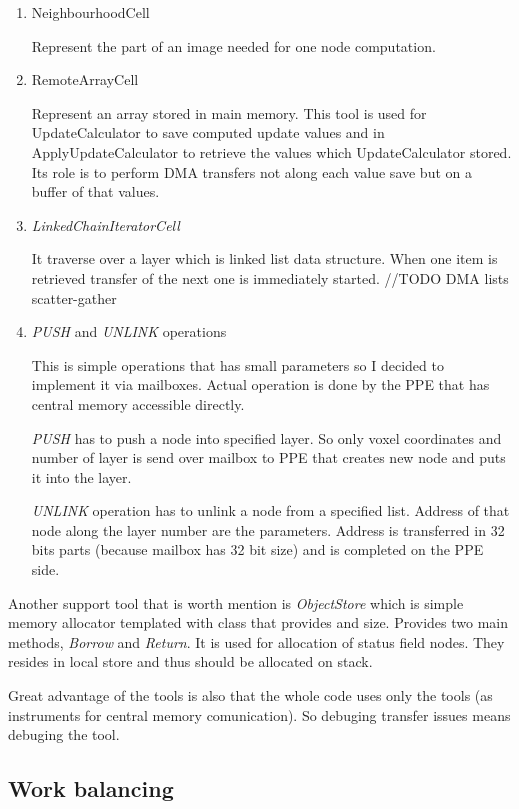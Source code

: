 \begin{enumerate}
\item NeighbourhoodCell
\par
Represent the part of an image needed for one node computation.

\item RemoteArrayCell
\par
Represent an array stored in main memory.
This tool is used for UpdateCalculator to save computed update values and in ApplyUpdateCalculator to retrieve the values which UpdateCalculator stored.
Its role is to perform DMA transfers not along each value save but on a buffer of that values.

\item \emph{LinkedChainIteratorCell}
\par
It traverse over a layer which is linked list data structure.
When one item is retrieved transfer of the next one is immediately started.
//TODO DMA lists scatter-gather

\item \emph{PUSH} and \emph{UNLINK} operations
\par
This is simple operations that has small parameters so I decided to implement it via mailboxes.
Actual operation is done by the PPE that has central memory accessible directly.
\par
\emph{PUSH} has to push a node into specified layer.
So only voxel coordinates and number of layer is send over mailbox to PPE that creates new node and puts it into the layer.

\par
\emph{UNLINK} operation has to unlink a node from a specified list.
Address of that node along the layer number are the parameters.
Address is transferred in 32 bits parts (because mailbox has 32 bit size) and is completed on the PPE side.
\end{enumerate}

Another support tool that is worth mention is \emph{ObjectStore} which is simple memory allocator templated with class that provides and size.
Provides two main methods, \emph{Borrow} and \emph{Return}.
It is used for allocation of status field nodes.
They resides in local store and thus should be allocated on stack.

Great advantage of the tools is also that the whole code uses only the tools (as instruments for central memory comunication).
So debuging transfer issues means debuging the tool.

\subsection{Work balancing}

